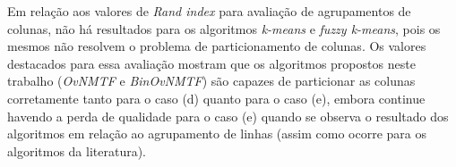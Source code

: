 \documentclass[
    12pt,                %
    oneside,            %
    a4paper,            %
    english,            %
    brazil                %
    ]{abntex2ppgsi}
\begin{document}

Em relação aos valores de \textit{Rand index} para avaliação de agrupamentos de colunas, não há resultados para os algoritmos \textit{k-means} e \textit{fuzzy k-means}, pois os mesmos não resolvem o problema de particionamento de colunas. Os valores destacados para essa avaliação mostram que os algoritmos propostos neste trabalho (\textit{OvNMTF} e \textit{BinOvNMTF}) são capazes de particionar as colunas corretamente tanto para o caso (d) quanto para o caso (e), embora continue havendo a perda de qualidade para o caso (e) quando se observa o resultado dos algoritmos em relação ao agrupamento de linhas (assim como ocorre para os algoritmos da literatura).




\end{document}
